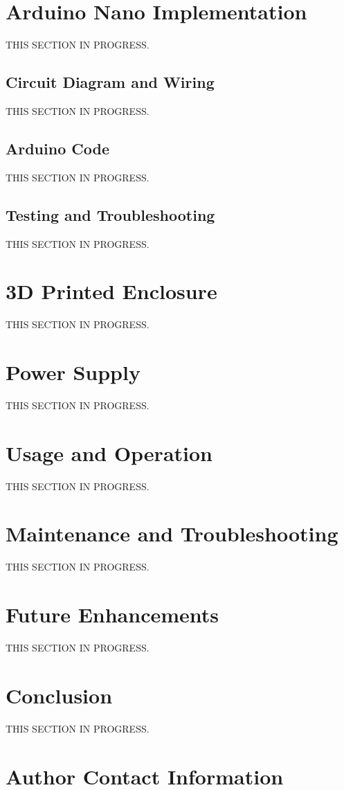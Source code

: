 \documentclass{article}
\begin{document}
\begin{multicols}{2}
		\section{Arduino Nano Implementation}
		THIS SECTION IN PROGRESS.
		
			\subsection{Circuit Diagram and Wiring}
			THIS SECTION IN PROGRESS.
			
			\subsection{Arduino Code}
			THIS SECTION IN PROGRESS.
			
			\subsection{Testing and Troubleshooting}
			THIS SECTION IN PROGRESS.
		
		\section{3D Printed Enclosure}
		THIS SECTION IN PROGRESS.
		
		\section{Power Supply}
		THIS SECTION IN PROGRESS.
		
		\section{Usage and Operation}
		THIS SECTION IN PROGRESS.
		
		\section{Maintenance and Troubleshooting}
		THIS SECTION IN PROGRESS.
		
		\section{Future Enhancements}
		THIS SECTION IN PROGRESS.
		
		\section{Conclusion}
		THIS SECTION IN PROGRESS.
	
		\section{Author Contact Information}
		
\end{multicols} %
\end{document}

